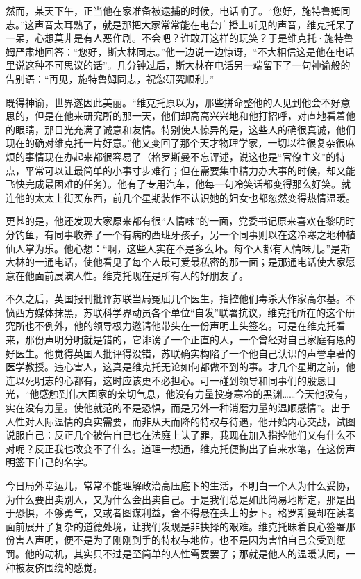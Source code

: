 然而，某天下午，正当他在家准备被逮捕的时候，电话响了。“您好，施特鲁姆同志。”这声音太耳熟了，就是那把大家常常能在电台广播上听见的声音，维克托呆了一呆，心想莫非是有人恶作剧。不会吧？谁敢开这样的玩笑？于是维克托·施特鲁姆严肃地回答：“您好，斯大林同志。”他一边说一边惊讶，“不大相信这是他在电话里说这种不可思议的话”。几分钟过后，斯大林在电话另一端留下了一句神谕般的告别语：“再见，施特鲁姆同志，祝您研究顺利。”

既得神谕，世界遂因此美丽。“维克托原以为，那些拼命整他的人见到他会不好意思的，但是在他来研究所的那一天，他们却高高兴兴地和他打招呼，对直地看着他的眼睛，那目光充满了诚意和友情。特别使人惊异的是，这些人的确很真诚，他们现在的确对维克托一片好意。”他又变回了那个天才物理学家，一切以往很复杂很麻烦的事情现在办起来都很容易了（格罗斯曼不忘评述，说这也是“官僚主义”的特点，平常可以让最简单的小事寸步难行；但在需要集中精力办大事的时候，却又能飞快完成最困难的任务）。他有了专用汽车，他每一句冷笑话都变得那么好笑。就连他的太太上街买东西，前几个星期装作不认识她的妇女也都忽然变得热情温暖。

更甚的是，他还发现大家原来都有很“人情味”的一面，党委书记原来喜欢在黎明时分钓鱼，有同事收养了一个有病的西班牙孩子，另一个同事则以在这冷寒之地种植仙人掌为乐。他心想：“啊，这些人实在不是多么坏。每个人都有人情味儿。”是斯大林的一通电话，使他看见了每个人最可爱最私密的那一面；是那通电话使大家愿意在他面前展演人性。维克托现在是所有人的好朋友了。

不久之后，英国报刊批评苏联当局冤屈几个医生，指控他们毒杀大作家高尔基。不愤西方媒体抹黑，苏联科学界动员各个单位“自发”联署抗议，维克托所在的这个研究所也不例外，他的领导极力邀请他带头在一份声明上头签名。可是在维克托看来，那份声明分明就是错的，它诽谤了一个正直的人，一个曾经对自己家庭有恩的好医生。他觉得英国人批评得没错，苏联确实构陷了一个他自己认识的声誉卓著的医学教授。违心害人，这真是维克托无论如何都做不到的事。才几个星期之前，他连以死明志的心都有，这时应该更不必担心。可一碰到领导和同事们的殷恳目光，“他感触到伟大国家的亲切气息，他没有力量投身寒冷的黑渊……今天他没有，实在没有力量。使他就范的不是恐惧，而是另外一种消磨力量的温顺感情”。出于人性对人际温情的真实需要，而非从天而降的特权与待遇，他开始内心交战，试图说服自己：反正几个被告自己也在法庭上认了罪，我现在加入指控他们又有什么不对呢？反正我也改变不了什么。道理一想通，维克托便掏出了自来水笔，在这份声明签下自己的名字。

今日局外幸运儿，常常不能理解政治高压底下的生活，不明白一个人为什么妥协，为什么要出卖别人，又为什么会出卖自己。于是我们总是如此简易地断定，那是出于恐惧，不够勇气，又或者图谋利益，舍不得悬在头上的萝卜。格罗斯曼却在读者面前展开了复杂的道德处境，让我们发现是非抉择的艰难。维克托昧着良心签署那份害人声明，便不是为了刚刚到手的特权与地位，也不是因为害怕自己会受到惩罚。他的动机，其实只不过是至简单的人性需要罢了；那就是他人的温暖认同，一种被友侪围绕的感觉。

